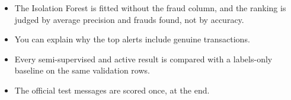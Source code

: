 \begin{labchecklists}
\begin{verification}
\begin{itemize}
  \item The Isolation Forest is fitted without the fraud column, and the ranking is judged by average precision and frauds found, not by accuracy.
  \item You can explain why the top alerts include genuine transactions.
  \item Every semi-supervised and active result is compared with a labels-only baseline on the same validation rows.
  \item The official test messages are scored once, at the end.
\end{itemize}
\end{verification}
\end{labchecklists}
